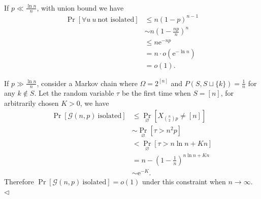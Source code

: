 ﻿\documentclass[11pt]{article}
\newenvironment{answer}[1][Answer]{\begin{trivlist}
\item[\hskip \labelsep {\bfseries #1.}\hskip \labelsep]}{\hfill$\lhd$\end{trivlist}}
\begin{document}
\begin{answer} ~

    If $p\ll \frac{\ln n}{n}$, with union bound we have
    $$
        \begin{aligned}
            \Pr[\forall u~u~\text{not isolated}] &\le n(1-p)^{n-1}\\
            &\sim n\left(1-\frac{np}{n}\right)^{n}\\
            &\le n\mathrm{e}^{-np}\\
            &= n\cdot o(\mathrm{e}^{-\ln n})\\
            &= o(1).
        \end{aligned}
    $$

    If $p\gg\frac{\ln n}{n}$, consider a Markov chain where $\Omega=2^{[n]}$ and $P(S,S\sqcup\{k\})=\frac{1}{n}$ for any $k\notin S$. Let the random variable $\tau$ be the first time when $S=[n]$, for arbitrarily chosen $K>0$, we have
    $$
        \begin{aligned}
            \Pr[\mathcal G(n,p)~\text{isolated}] &\le \Pr_{\varnothing}[X_{\binom{n}{2}p}\neq[n]]\\
            &\sim \Pr_{\varnothing}[\tau>n^2p]\\
            &< \Pr_{\varnothing}[\tau>n\ln n+Kn]\\
            &= n-\left(1-\frac{1}{n}\right)^{n\ln n+Kn}\\
            &\sim \mathrm{e}^{-K}.
        \end{aligned}
    $$
    Therefore $\Pr[\mathcal G(n,p)~\text{isolated}]=o(1)$ under this constraint when $n\to\infty$.
\end{answer}
\end{document}
